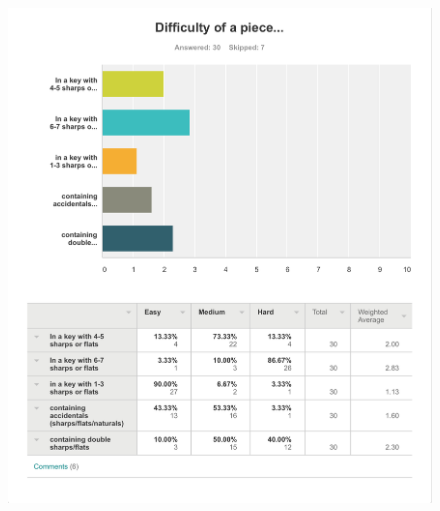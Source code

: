 \begin{appendices}
\begin{figure}[H]
\end{figure}

\begin{figure}[H]
\centering
\includegraphics[width=\textwidth]{survey_results/keysig}
\end{figure}


\end{appendices}
